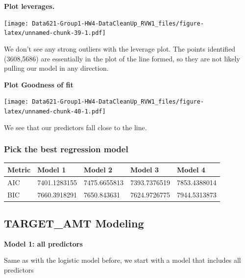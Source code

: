 \documentclass[]{article}
\begin{document}
\textbf{Plot leverages.}

\texttt{[image: Data621-Group1-HW4-DataCleanUp\_RVW1\_files/figure-latex/unnamed-chunk-39-1.pdf]}

We don't see any strong outliers with the leverage plot. The points
identified (3608,5686) are essentially in the plot of the line formed,
so they are not likely pulling our model in any direction.

\textbf{Plot Goodness of fit}

\texttt{[image: Data621-Group1-HW4-DataCleanUp\_RVW1\_files/figure-latex/unnamed-chunk-40-1.pdf]}

We see that our predictors fall close to the line.

\subsubsection{Pick the best regression
model}\label{pick-the-best-regression-model}

\begin{longtable}[]{@{}lllll@{}}
\toprule
Metric & Model 1 & Model 2 & Model 3 & Model 4\tabularnewline
\midrule
\endhead
AIC & 7401.1283155 & 7475.6655813 & 7393.7376519 &
7853.4388014\tabularnewline
BIC & 7660.3918291 & 7650.843631 & 7624.9726775 &
7944.5313873\tabularnewline
\bottomrule
\end{longtable}

\subsection{TARGET\_AMT Modeling}\label{target_amt-modeling}

\textbf{Model 1: all predictors}

Same as with the logistic model before, we start with a model that
includes all predictors
\end{document}
